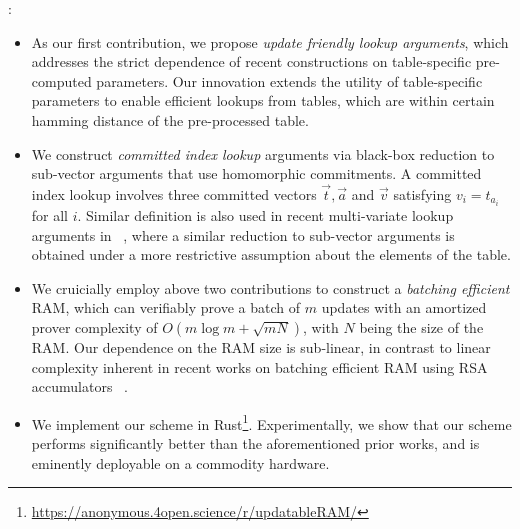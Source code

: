\documentclass[sigconf]{acmart}
\begin{document}
:
\begin{itemize}[leftmargin=2em]
\item As our first contribution, we propose {\em update friendly lookup arguments}, which addresses
the strict dependence of recent constructions on table-specific pre-computed parameters. Our
innovation extends the utility of table-specific parameters to enable efficient lookups from tables,
which are within certain hamming distance of the pre-processed table.
\item We construct {\em committed index lookup} arguments via black-box reduction to
sub-vector arguments that use homomorphic commitments. A committed index lookup involves
three committed vectors $\vec{t},\vec{a}$ and $\vec{v}$ satisfying $v_i=t_{a_i}$ for all $i$. Similar
definition is also used in recent multi-variate lookup arguments in ~\cite{lasso}, where a similar reduction
to sub-vector arguments is obtained under a more restrictive assumption about the elements of the table.
\item We cruicially employ above two contributions to construct a {\em batching efficient} RAM, which
can verifiably prove a batch of $m$ updates with an amortized prover complexity of $O(m\log m + \sqrt{mN})$,
with $N$ being the size of the RAM. Our dependence on the RAM size is sub-linear, in contrast to linear complexity
inherent in recent works on batching efficient RAM using RSA accumulators ~\cite{}.
\item We implement our scheme in Rust\footnote{\url{https://anonymous.4open.science/r/updatableRAM/}}.
Experimentally, we show that our scheme performs significantly better than the aforementioned prior works,
and is eminently deployable on a commodity hardware.
\end{itemize}
\end{document}
